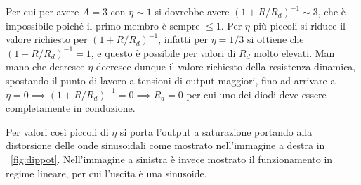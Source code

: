 \documentclass[10pt,a4paper]{article}
\begin{document}
Per cui per avere $A = 3$ con $\eta \sim 1$ si dovrebbe avere $(1 + R/R_{d})^{-1} \sim 3$, che è impossibile poiché il primo membro è sempre $\leq 1$.
Per $\eta$ più piccoli si riduce il valore richiesto per $(1 + R/R_{d})^{-1}$, infatti per $\eta = 1/3$ si ottiene che $(1 + R/R_{d})^{-1} = 1$, e questo è possibile per valori di $R_{d}$ molto elevati. Man mano che decresce $\eta$ decresce dunque il valore richiesto della resistenza dinamica, spostando il punto di lavoro a tensioni di output maggiori, fino ad arrivare a $\eta = 0 \implies (1 + R/R_{d})^{-1} = 0 \implies R_{d} = 0$ per cui uno dei diodi deve essere completamente in conduzione.

Per valori così piccoli di $\eta$ si porta l'output a saturazione portando alla distorsione delle onde sinusoidali come mostrato nell'immagine a destra in \figurename{~\ref{fig:dippot}}. Nell'immagine a sinistra è invece mostrato il funzionamento in regime lineare, per cui l'uscita è una sinusoide.
\end{document}
